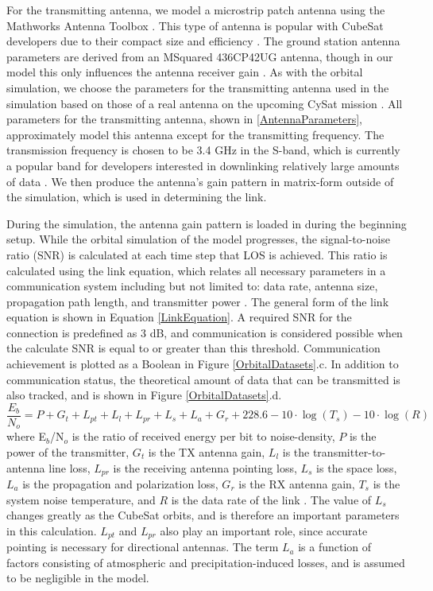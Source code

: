 \documentclass[conf]{new-aiaa}
\begin{document}
For the transmitting antenna, we model a microstrip patch antenna using the Mathworks Antenna Toolbox \cite{AntennaToolbox}. This type of antenna is popular with CubeSat developers due to their compact size and efficiency \cite{Tharun2019,Neveu2013,Liu2019}. The ground station antenna parameters are derived from an MSquared 436CP42UG antenna, though in our model this only influences the antenna receiver gain \cite{M2AntennaSystems}. As with the orbital simulation, we choose the parameters for the transmitting antenna used in the simulation based on those of a real antenna on the upcoming CySat mission \cite{Nelson2020}. All parameters for the transmitting antenna, shown in \ref{AntennaParameters}, approximately model this antenna except for the transmitting frequency. The transmission frequency is chosen to be 3.4 GHz in the S-band, which is currently a popular band for developers interested in downlinking relatively large amounts of data \cite{daylee2018,Pittella2016,Nascetti2015,FaiselTubbal2015,Islam2015}. We then produce the antenna's gain pattern in matrix-form outside of the simulation, which is used in determining the link.

During the simulation, the antenna gain pattern is loaded in during the beginning setup. While the orbital simulation of the model progresses, the signal-to-noise ratio (SNR) is calculated at each time step that LOS is achieved. This ratio is calculated using the link equation, which relates all necessary parameters in a communication system including but not limited to: data rate, antenna size, propagation path length, and transmitter power \cite{Wertz1999,IET2014}. The general form of the link equation is shown in Equation \ref{LinkEquation}. A required SNR for the connection is predefined as 3 dB, and communication is considered possible when the calculate SNR is equal to or greater than this threshold. Communication achievement is plotted as a Boolean in Figure \ref{OrbitalDatasets}.c. In addition to communication status, the theoretical amount of data that can be transmitted is also tracked, and is shown in Figure \ref{OrbitalDatasets}.d.
%
\begin{equation}
\frac{E_b}{N_o} = P + G_t + L_{pt} + L_l + L_{pr} + L_s + L_a + G_r + 228.6 - 10 \cdot \log(T_s) - 10 \cdot \log(R)
\label{LinkEquation}
\end{equation}
%
where E$_{b}$/N$_{o}$ is the ratio of received energy per bit to noise-density,
$P$ is the power of the transmitter, $G_t$ is the TX antenna gain, $L_l$ is the transmitter-to-antenna line loss, $L_{pr}$ is the receiving antenna pointing loss, $L_s$ is the space loss, $L_a$ is the propagation and polarization loss, $G_r$ is the RX antenna gain, $T_s$ is the system noise temperature, and $R$ is the data rate of the link \citep{Wertz1999}. The value of $L_s$ changes greatly as the CubeSat orbits, and is therefore an important parameters in this calculation. $L_{pt}$ and $L_{pr}$ also play an important role, since accurate pointing is necessary for directional antennas. The term $L_a$ is a function of factors consisting of atmospheric and precipitation-induced losses, and is assumed to be negligible in the model.
\end{document}
